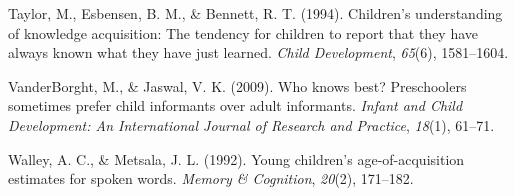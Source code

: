 \documentclass[10pt, letterpaper]{article}
\newenvironment{CSLReferences}%
  {}%
  {\par}
\begin{document}
\begin{CSLReferences}{1}{0}
\leavevmode\hypertarget{ref-taylor1994}{}%
Taylor, M., Esbensen, B. M., \& Bennett, R. T. (1994). Children's
understanding of knowledge acquisition: The tendency for children to
report that they have always known what they have just learned.
\emph{Child Development}, \emph{65}(6), 1581--1604.

\leavevmode\hypertarget{ref-vanderborght2009}{}%
VanderBorght, M., \& Jaswal, V. K. (2009). Who knows best? Preschoolers
sometimes prefer child informants over adult informants. \emph{Infant
and Child Development: An International Journal of Research and
Practice}, \emph{18}(1), 61--71.

\leavevmode\hypertarget{ref-walley1992}{}%
Walley, A. C., \& Metsala, J. L. (1992). Young children's
age-of-acquisition estimates for spoken words. \emph{Memory \&
Cognition}, \emph{20}(2), 171--182.

\end{CSLReferences}


\end{document}
